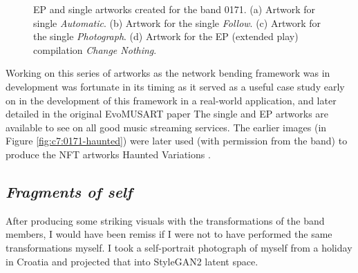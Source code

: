 \begin{figure}[!htbp]
    \caption[0171 EP artworks]{EP and single artworks created for the band 0171. (a) Artwork for single \textit{Automatic}. (b) Artwork for the single \textit{Follow}. (c) Artwork for the single \textit{Photograph}. (d) Artwork for the EP (extended play) compilation \textit{Change Nothing}.}
    \label{fig:c7:0171-EP}
 \end{figure}

Working on this series of artworks as the network bending framework was in development was fortunate in its timing as it served as a useful case study early on in the development of this framework in a real-world application, and later detailed in the original EvoMUSART paper \citep{broad2021network} 
The single and EP artworks are available to see on all good music streaming services.
The earlier images (in Figure \ref{fig:c7:0171-haunted}) were later used (with permission from the band) to produce the NFT artworks Haunted Variations \citep{broad2021haunted1,broad2021haunted2}. 

\subsection{\textit{Fragments of self}}
\label{c7:subsubsec:fragments}

After producing some striking visuals with the transformations of the band members, I would have been remiss if I were not to have performed the same transformations myself. 
I took a self-portrait photograph of myself from a holiday in Croatia and projected that into StyleGAN2 latent space. 


